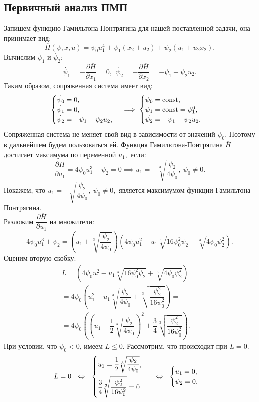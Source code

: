 \documentclass{article}
\begin{document}
\subsection{Первичный анализ ПМП}
Запишем функцию Гамильтона-Понтрягина для нашей поставленной задачи, она принимает вид:
$$\overline{H}(\psi, x, u) = \psi_0u_1^4+\psi_1(x_2+u_2)+\psi_2(u_1+u_2x_2).$$
Вычислим $\dot{\psi_1}$ и $\dot{\psi_2}$:
$$\dot{\psi_1} = -\dfrac{\partial \overline{H}}{\partial x_1} = 0,~~ \dot{\psi_2} = -\dfrac{\partial \overline{H}}{\partial x_2} = -\psi_1-\psi_2u_2.$$
Таким образом, сопряженная система имеет вид:
$$
\begin{cases}
\dot{\psi_0} = 0,\\
\dot{\psi_1} = 0,\\
\dot{\psi_2} = -\psi_1-\psi_2u_2,
\end{cases}
\implies
\begin{cases}
\psi_0 = \mathrm{const},\\
\psi_1 = \mathrm{const} = \psi_1^0,\\
\dot{\psi_2} = -\psi_1-\psi_2u_2.
\end{cases}
$$
Сопряженная система не меняет свой вид в зависимости от значений $\psi_0.$ Поэтому в дальнейшем будем пользоваться ей.
Функция Гамильтона-Понтрягина $\overline{H}$ достигает максимума по переменной $u_1,$ если:
$$\dfrac{\partial\overline{H}}{\partial u_1} = 4\psi_0u_1^3 +\psi_2 = 0 \implies u_1 = -\sqrt[3]{\dfrac{\psi_2}{4\psi_0}}, ~\psi_0 \neq 0.$$
Покажем, что $u_1=-\sqrt{\dfrac{\psi_2}{4\psi_0}},~ \psi_0 \neq0,$ является максимумом функции Гамильтона-Понтрягина. \\
Разложим $\dfrac{\partial\overline{H}}{\partial u_1}$ на множители:
$$4\psi_0u_1^3+\psi_2 = \left(u_1 + \sqrt[3]{\dfrac{\psi_2}{4\psi_0}}\right)\left(4\psi_0u_1^2-u_1\sqrt[3]{16\psi_0^2\psi_2}+\sqrt[3]{4\psi_0\psi_2^2}\right).$$
Оценим вторую скобку:
\begin{multline}
L = \left(4\psi_0 u_1^2 - u_1 \sqrt[3]{16\psi_0^2\psi_2} + \sqrt[3]{4\psi_0\psi_2^2}\right)= \\
= 4\psi_0\left(u_1^2 - u_1 \sqrt[3]{\dfrac{\psi_2}{4\psi_0}} + \sqrt[3]{\dfrac{\psi_2^2}{16\psi_0^2}}\right)= \\
= 4\psi_0\left(\left(u_1 - \dfrac{1}{2}\sqrt[3]{\dfrac{\psi_2}{4\psi_0}}\right)^2 + \dfrac{3}{4}\sqrt[3]{\dfrac{\psi_2^2}{16\psi_0^2}}\right).
\end{multline}
При условии, что $\psi_0 <0$, имеем $L\leqslant0.$ Рассмотрим, что происходит при $L=0 $.
$$L = 0 ~~\Leftrightarrow ~~
\begin{cases}
    u_1 = \dfrac{1}{2}\sqrt[3]{\dfrac{\psi_2}{4\psi_0}},\vspace{5pt}\\
    \dfrac{3}{4}\sqrt[3]{\dfrac{\psi_2^2}{16\psi_0^2}} = 0
\end{cases}
~~\Leftrightarrow ~~
\begin{cases}
    u_1 = 0,\\
    \psi_2 = 0.
\end{cases}
$$
\end{document}
